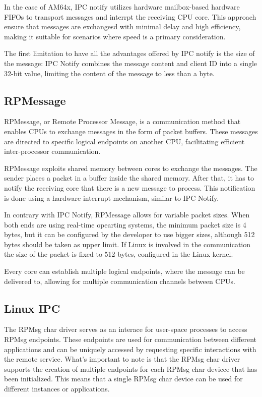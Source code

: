 In the case of AM64x, IPC notify utilizes hardware mailbox-based hardware FIFOs
to transport messages and interrpt the receiving CPU core.
This approach ensure that messages are exchangesd with minimal delay and high
efficiency, making it suitable for scenarios where speed is a primary
consideration.

The first limitation to have all the advantages offered by IPC notify is the
size of the message: IPC Notify combines the message content and client ID into
a single 32-bit value, limiting the content of the message to less than a byte.

\subsection{RPMessage}

RPMessage, or Remote Processor Message, is a communication method that enables
CPUs to exchange messages in the form of packet buffers. These messages are
directed to specific logical endpoints on another CPU, facilitating efficient
inter-processor communication.

RPMessage exploits shared memory between cores to exchange the messages.
The sender places a packet in a buffer inside the shared memory. After that,
it has to notify the receiving core that there is a new message to process.
This notification is done using a hardware interrupt mechanism, similar to
IPC Notify.

In contrary with IPC Notify, RPMessage allows for variable packet sizes.
When both ends are using real-time opearting systems, the minimum packet size
is 4 bytes, but it can be configured by the developer to use bigger sizes,
although 512 bytes should be taken as upper limit.
If Linux is involved in the communication the size of the packet is fixed to
512 bytes, configured in the Linux kernel.

Every core can establish multiple logical endpoints, where the message can be
delivered to, allowing for multiple communication channels between CPUs.

\subsection{Linux IPC}

The RPMsg char driver serves as an interace for user-space processes to
access RPMsg endpoints. These endpoints are used for communication between
different applications and can be uniquely accessed by requesting specific
interactions with the remote service. What's important to note is that the
RPMsg char driver supports the creation of multiple endpoints for each RPMsg
char devicce that has been initialized. This means that a single RPMsg char
device can be used for different instances or applications.

